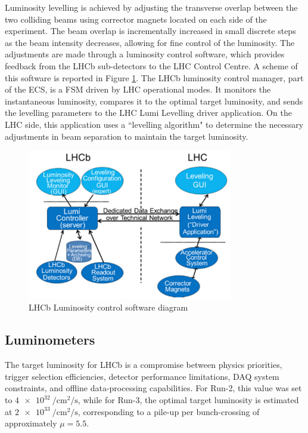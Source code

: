 Luminosity levelling is achieved by adjusting the transverse overlap between the two colliding beams using corrector magnets located on each side of the experiment. The beam overlap is incrementally increased in small discrete steps as the beam intensity decreases, allowing for fine control of the luminosity. The adjustments are made through a luminosity control software, which provides feedback from the LHCb sub-detectors to the LHC Control Centre. A scheme of this software is reported in Figure \ref{fig:lumi-control}.
The LHCb luminosity control manager, part of the ECS, is a FSM driven by LHC operational modes. It monitors the instantaneous luminosity, compares it to the optimal target luminosity, and sends the levelling parameters to the LHC Lumi Levelling driver application. On the LHC side, this application uses a ``levelling algorithm" to determine the necessary adjustments in beam separation to maintain the target luminosity.

\begin{figure}
    \centering
    \includegraphics[width=0.8\textwidth]{figures/lumi_control.png}
    \caption{LHCb Luminosity control software diagram}
    \label{fig:lumi-control}
\end{figure}

\subsection{Luminometers}
The target luminosity for LHCb is a compromise between physics priorities, trigger selection efficiencies, detector performance limitations, DAQ system constraints, and offline data-processing capabilities. For Run-2, this value was set to $\SI{4e32}{\per\centi\meter\squared\per\second}$, while for Run-3, the optimal target luminosity is estimated at $\SI{2e33}{\per\centi\meter\squared\per\second}$, corresponding to a pile-up per bunch-crossing of approximately $\mu = 5.5$.

